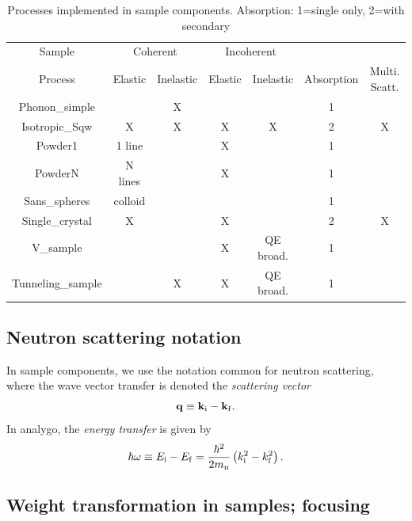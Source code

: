 \begin{table}
  \begin{center}
  {\let\my=\\
    \begin{tabular}{|c|cc|cc|c|c|}
    \hline
    Sample        & \multicolumn{2}{c|}{Coherent} & \multicolumn{2}{c|}{Incoherent} &&\\
    Process       & Elastic & Inelastic & Elastic & Inelastic & Absorption & Multi. Scatt.\\
    \hline
    Phonon\_simple&         & X         &         &           & 1 & \\
    Isotropic\_Sqw&  X      & X         & X       & X         & 2 & X \\
    Powder1       &  1 line &           & X       &           & 1 & \\
    PowderN       &  N lines&           & X       &           & 1 & \\
    Sans\_spheres &  colloid&           &         &           & 1 & \\
    Single\_crystal& X      &           & X       &           & 2 & X \\
    V\_sample     &         &           & X       & QE broad. & 1 & \\
    Tunneling\_sample &     & X         & X       & QE broad. & 1 & \\
    \hline
    \end{tabular}
    \caption{Processes implemented in sample components. Absorption: 1=single only, 2=with secondary}
    \label{t:sample-process}
  }
  \end{center}
\end{table}
\subsection{Neutron scattering notation}
In sample components, we use the notation common for neutron scattering,
where the wave vector transfer is denoted the {\em scattering vector}
\begin{equation} \label{eq:q-transfer}
{\bf q} \equiv {\bf k}_{\rm i} - {\bf k}_{\rm f} .
\end{equation}
In analygo, the {\em energy transfer} is given by
\begin{equation} \label{eq:w-transfer}
\hbar \omega \equiv E_{\rm i} - E_{\rm f} =
\frac{\hbar^2}{2 m_{\rm n}} \left( k_{\rm i}^2 - k_{\rm f}^2 \right) .
\end{equation}

\subsection{Weight transformation in samples; focusing}

